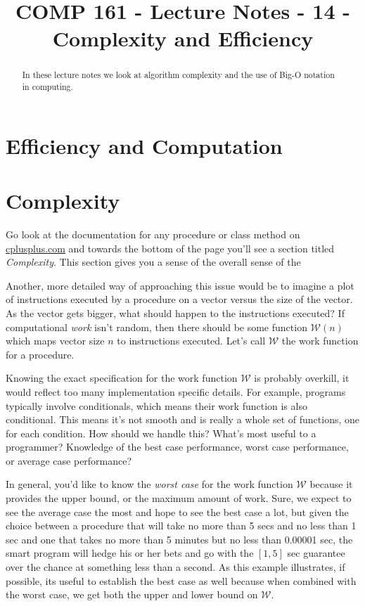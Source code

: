 \documentclass[]{tufte-handout}
\title{COMP 161 - Lecture Notes - 14 - Complexity and Efficiency}
\date{}
\begin{document}
 
\maketitle

\begin{abstract}
In these lecture notes we look at algorithm complexity and the use of Big-O notation in computing. 
\end{abstract}

\section{Efficiency and Computation}


\section{Complexity}

Go look at the documentation for any procedure or class method on \url{cplusplus.com} and towards the bottom of the page you'll see a section titled \textit{Complexity}. This section gives you a sense of the overall sense of the 





Another, more detailed way of approaching this issue would be to imagine a plot of instructions executed by a procedure on a vector versus the size of the vector. As the vector gets bigger, what should happen to the instructions executed? If computational \textit{work} isn't random, then there should be some function $\mathcal{W}(n)$ which maps vector size $n$ to instructions executed. Let's call $\mathcal{W}$ the work function for a procedure.

Knowing the exact specification for the work function $\mathcal{W}$ is probably overkill, it would reflect too many implementation specific details. For example, programs typically involve conditionals, which means their work function is also conditional. This means it's not smooth and is really a whole set of functions, one for each condition. How should we handle this? What's most useful to a programmer? Knowledge of the best case performance, worst case performance, or average case performance?  

In general, you'd like to know the \textit{worst case} for the work function $\mathcal{W}$ because it provides the upper bound, or the maximum amount of work. Sure, we expect to see the average case the most and hope to see the best case a lot, but given the choice between a procedure that will take no more than 5 secs and no less than 1 sec and one that takes no more than 5 minutes but no less than 0.00001 sec, the smart program will hedge his or her bets and go with the $[1,5]$ sec guarantee over the chance at something less than a second. As this example illustrates, if possible, its useful to establish the best case as well because when combined with the worst case, we get both the upper and lower bound on $\mathcal{W}$.  
\end{document}
